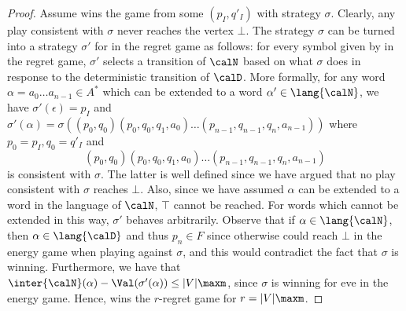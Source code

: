 \documentclass[a4paper]{article}
\begin{document}
\begin{proof}
	Assume \eve wins the game from some $(p_I,q'_I)$ with strategy $\sigma$.
	Clearly, any play consistent with $\sigma$ never reaches the vertex
	$\bot$. The strategy $\sigma$ can be turned into a strategy $\sigma'$
	for \eve in the regret game as follows: for every symbol given by \adam
	in the regret game, $\sigma'$ selects a transition of $\calN$ based on
	what $\sigma$ does in response to the deterministic transition of
	$\calD$. More formally, for any word $\alpha = a_0 \dots a_{n-1} \in
	A^*$ which can be extended to a word $\alpha' \in \lang{\calN}$, we have
	$\sigma'(\epsilon) = p_I$ and $\sigma'(\alpha) = \sigma\left(
	(p_0,q_0) (p_0,q_0,q_1,a_0) \dots (p_{n-1},q_{n-1},q_n,a_{n-1}) \right)$
	where $p_0 = p_I, q_0 = q'_I$ and 
	\[
		(p_0,q_0) (p_0,q_0,q_1,a_0) \dots (p_{n-1},q_{n-1},q_n,a_{n-1})
	\]
	is consistent with $\sigma$. The latter
	is well defined since we have argued that no play consistent with
	$\sigma$ reaches $\bot$. Also, since we have assumed
	$\alpha$ can be extended to a word in the language of $\calN$, $\top$
	cannot be reached. For words which cannot be extended in this way,
	$\sigma'$ behaves arbitrarily. Observe that if $\alpha \in
	\lang{\calN}$, then $\alpha \in \lang{\calD}$ and thus $p_n \in F$ since
	otherwise \adam could reach $\bot$ in the energy game when playing
	against $\sigma$, and this would contradict the fact that $\sigma$ is
	winning. Furthermore, we have that $\inter{\calN}(\alpha) -
	\Val(\sigma'(\alpha)) \le |V|\maxm$, since $\sigma$
	is winning for eve in the energy game. Hence, \eve wins the $r$-regret
	game for $r = |V|\maxm$.


\end{proof}
\end{document}
